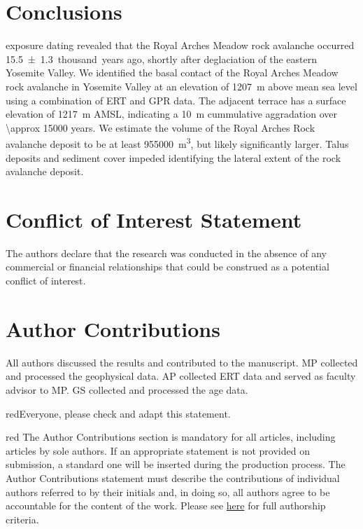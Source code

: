 \documentclass[utf8]{frontiersSCNS}
\newcommand{\alon}{\begin{color}{red}}
\newcommand{\aloff}{\end{color}}
\begin{document}
\section{Conclusions}\label{sec:conclusions}

 exposure dating revealed that the Royal Arches Meadow rock avalanche occurred \num{15.5+-1.3}~thousand~years ago, shortly after deglaciation of the eastern Yosemite Valley. We identified the basal contact of the Royal Arches Meadow rock avalanche in Yosemite Valley at an elevation of \SI{1207}{m} above mean sea level using a combination of ERT and GPR data. The adjacent terrace has a surface elevation of \SI{1217}{m} AMSL, indicating a \SI{10}{m} cummulative aggradation over \num{\approx 15000} years. We estimate the volume of the Royal Arches Rock avalanche deposit to be at least \SI{955000}{m^3}, but likely significantly larger. Talus deposits and sediment cover impeded identifying the lateral extent of the rock avalanche deposit. 






\section*{Conflict of Interest Statement}
The authors declare that the research was conducted in the absence of any commercial or financial relationships that could be construed as a potential conflict of interest.


\section*{Author Contributions}
All authors discussed the results and contributed to the manuscript. MP collected and processed the geophysical data. AP collected ERT data and served as faculty advisor to MP. GS collected and processed the  age data. 

\alon Everyone, please check and adapt this statement. \aloff

\alon
The Author Contributions section is mandatory for all articles, including articles by sole authors. If an appropriate statement is not provided on submission, a standard one will be inserted during the production process. The Author Contributions statement must describe the contributions of individual authors referred to by their initials and, in doing so, all authors agree to be accountable for the content of the work. Please see  \href{http://home.frontiersin.org/about/author-guidelines#AuthorandContributors}{here} for full authorship criteria.
\aloff
\end{document}
